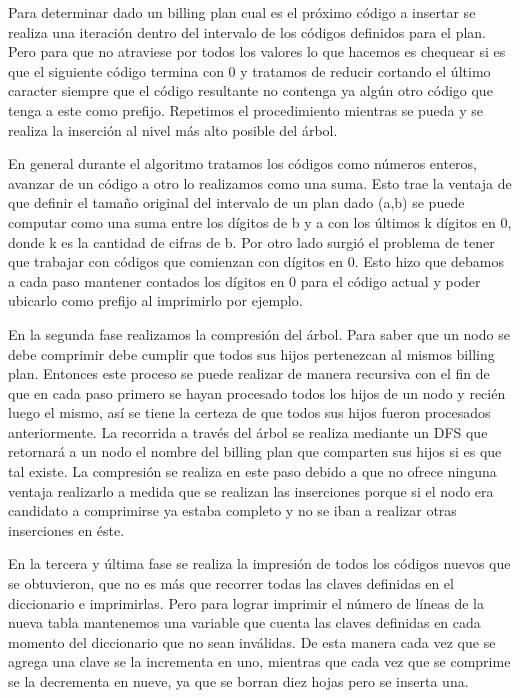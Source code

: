 Para determinar dado un billing plan cual es el próximo código a insertar 
se realiza una iteración dentro del intervalo de los códigos definidos para el plan.
Pero para que no atraviese por todos los valores lo que hacemos es chequear si es que el siguiente
código termina con 0 y tratamos de reducir cortando el último caracter siempre que el 
código resultante no contenga ya algún otro código que tenga a este como prefijo. Repetimos el procedimiento
mientras se pueda y se realiza la inserción al nivel más alto posible del árbol.

En general durante el algoritmo tratamos los códigos como números enteros, avanzar de un código a otro lo realizamos 
como una suma. Esto trae la ventaja de que definir el tamaño original del intervalo de un plan dado (a,b) 
se puede computar como una suma entre los dígitos de b y a con los últimos k dígitos en 0, donde k es la cantidad de cifras de b.
Por otro lado surgió el problema de tener que trabajar con códigos que comienzan con dígitos en 0. 
Esto hizo que debamos a cada paso mantener contados los dígitos en 0 para el código actual y poder ubicarlo como prefijo al imprimirlo por ejemplo.


En la segunda fase realizamos la compresión del árbol. 
Para saber que un nodo se debe comprimir debe cumplir que todos sus hijos pertenezcan al mismos billing plan.
Entonces este proceso se puede realizar de manera recursiva con el fin de que en cada paso primero se hayan procesado
todos los hijos de un nodo y recién luego el mismo, así se tiene la certeza de que todos sus hijos fueron procesados
anteriormente. La recorrida a través del árbol se realiza mediante un DFS que retornará a un nodo el nombre del billing plan que 
comparten sus hijos si es que tal existe. La compresión se realiza en este paso debido a que no ofrece
ninguna ventaja realizarlo a medida que se realizan las inserciones porque si el nodo era candidato a comprimirse
ya estaba completo y no se iban a realizar otras inserciones en éste.

En la tercera y última fase se realiza la impresión de todos los códigos nuevos que se obtuvieron, que no es más que recorrer
todas las claves definidas en el diccionario e imprimirlas. Pero para lograr imprimir el número de líneas de la nueva tabla
mantenemos una variable que cuenta las claves definidas en cada momento del diccionario que no sean inválidas.
De esta manera cada vez que se agrega una clave se la incrementa en uno, mientras que cada vez que se comprime se la decrementa en 
nueve, ya que se borran diez hojas pero se inserta una.

